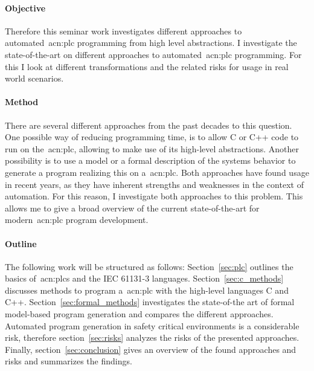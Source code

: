 \paragraph{Objective}
Therefore this seminar work investigates different approaches to automated~\gls{acn:plc} programming from high level abstractions.
I investigate the state-of-the-art on different approaches to automated~\gls{acn:plc} programming.
For this I look at different transformations and the related risks for usage in real world scenarios.

\paragraph{Method}
There are several different approaches from the past decades to this question.
One possible way of reducing programming time, is to allow C or C++ code to run on the~\gls{acn:plc}, allowing to make use of its high-level abstractions.
Another possibility is to use a model or a formal description of the systems behavior to generate a program realizing this on a~\gls{acn:plc}.
Both approaches have found usage in recent years, as they have inherent strengths and weaknesses in the context of automation.
For this reason, I investigate both approaches to this problem.
This allows me to give a broad overview of the current state-of-the-art for modern~\gls{acn:plc} program development.

\paragraph{Outline}
The following work will be structured as follows: 
Section~\ref{sec:plc} outlines the basics of~\glspl{acn:plc} and the IEC 61131-3 languages. 
Section~\ref{sec:c_methods} discusses methods to program a~\gls{acn:plc} with the high-level languages C and C++.
Section~\ref{sec:formal_methods} investigates the state-of-the art of formal model-based program generation and compares the different approaches.
Automated program generation in safety critical environments is a considerable risk, therefore section~\ref{sec:risks} analyzes the risks of the presented approaches.
Finally, section~\ref{sec:conclusion} gives an overview of the found approaches and risks and summarizes the findings.